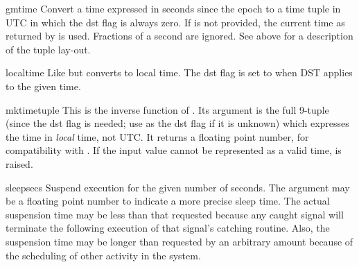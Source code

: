 \begin{funcdesc}{gmtime}{}
Convert a time expressed in seconds since the epoch to a time tuple
in UTC in which the dst flag is always zero.  If  is not
provided, the current time as returned by  is used.
Fractions of a second are ignored.  See above for a description of the
tuple lay-out.
\end{funcdesc}

\begin{funcdesc}{localtime}{}
Like  but converts to local time.  The dst flag is
set to  when DST applies to the given time.
\end{funcdesc}

\begin{funcdesc}{mktime}{tuple}
This is the inverse function of .  Its argument
is the full 9-tuple (since the dst flag is needed; use  as
the dst flag if it is unknown) which expresses the time in
\emph{local} time, not UTC.  It returns a floating point number, for
compatibility with .  If the input value cannot be
represented as a valid time,  is raised.
\end{funcdesc}

\begin{funcdesc}{sleep}{secs}
Suspend execution for the given number of seconds.  The argument may
be a floating point number to indicate a more precise sleep time.
The actual suspension time may be less than that requested because any
caught signal will terminate the  following
execution of that signal's catching routine.  Also, the suspension
time may be longer than requested by an arbitrary amount because of
the scheduling of other activity in the system.
\end{funcdesc}

